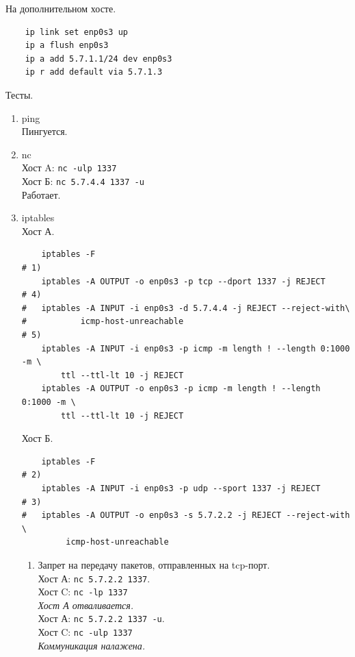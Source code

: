 \documentclass[11pt, a4paper] {ncc}
\begin{document}
    На дополнительном хосте.
\begin{verbatim}
    ip link set enp0s3 up
    ip a flush enp0s3
    ip a add 5.7.1.1/24 dev enp0s3
    ip r add default via 5.7.1.3
\end{verbatim}

    Тесты.
    \begin{enumerate}
        \item ping \\
            Пингуется.
        \item nc \\
            Хост A: \texttt{nc -ulp 1337}\\
            Хост Б: \texttt{nc 5.7.4.4 1337 -u}\\
            Работает.
        \item iptables \\
            Хост А.
            \begin{verbatim}
    iptables -F
# 1)
    iptables -A OUTPUT -o enp0s3 -p tcp --dport 1337 -j REJECT
# 4)
#   iptables -A INPUT -i enp0s3 -d 5.7.4.4 -j REJECT --reject-with\
#           icmp-host-unreachable
# 5)
    iptables -A INPUT -i enp0s3 -p icmp -m length ! --length 0:1000 -m \
        ttl --ttl-lt 10 -j REJECT
    iptables -A OUTPUT -o enp0s3 -p icmp -m length ! --length 0:1000 -m \
        ttl --ttl-lt 10 -j REJECT
            \end{verbatim}
            Хост Б.
            \begin{verbatim}
    iptables -F
# 2)
    iptables -A INPUT -i enp0s3 -p udp --sport 1337 -j REJECT
# 3)
#   iptables -A OUTPUT -o enp0s3 -s 5.7.2.2 -j REJECT --reject-with \
         icmp-host-unreachable
            \end{verbatim}
            \begin{enumerate}
                \item Запрет на передачу пакетов, отправленных на tcp-порт.\\
                    Хост А: \texttt{nc 5.7.2.2 1337}. \\
                    Хост C: \texttt{nc -lp 1337} \\
                    {\it Хост А отваливается. \\}
                    Хост А: \texttt{nc 5.7.2.2 1337 -u}. \\
                    Хост C: \texttt{nc -ulp 1337} \\
                    {\it Коммуникация налажена. \\}

\end{enumerate}
\end{enumerate}
\end{document}

